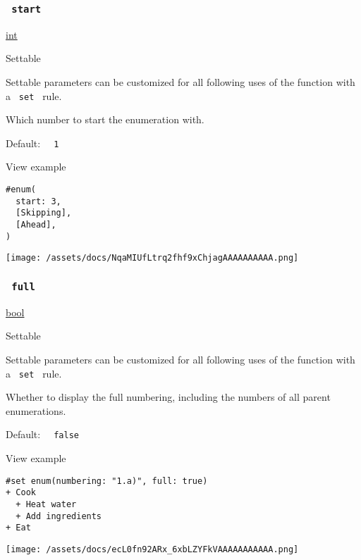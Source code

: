 \subsubsection{\texorpdfstring{\texttt{\ start\ }}{ start }}\label{parameters-start}

\href{/docs/reference/foundations/int/}{int}

{{ Settable }}

\label{parameters-start-settable-tooltip}
Settable parameters can be customized for all following uses of the
function with a \texttt{\ set\ } rule.

Which number to start the enumeration with.

Default: \texttt{\ }{\texttt{\ 1\ }}\texttt{\ }


View example

\begin{verbatim}
#enum(
  start: 3,
  [Skipping],
  [Ahead],
)
\end{verbatim}

\texttt{[image: /assets/docs/NqaMIUfLtrq2fhf9xChjagAAAAAAAAAA.png]}

\subsubsection{\texorpdfstring{\texttt{\ full\ }}{ full }}\label{parameters-full}

\href{/docs/reference/foundations/bool/}{bool}

{{ Settable }}

\label{parameters-full-settable-tooltip}
Settable parameters can be customized for all following uses of the
function with a \texttt{\ set\ } rule.

Whether to display the full numbering, including the numbers of all
parent enumerations.

Default: \texttt{\ }{\texttt{\ false\ }}\texttt{\ }


View example

\begin{verbatim}
#set enum(numbering: "1.a)", full: true)
+ Cook
  + Heat water
  + Add ingredients
+ Eat
\end{verbatim}

\texttt{[image: /assets/docs/ecL0fn92ARx\_6xbLZYFkVAAAAAAAAAAA.png]}


